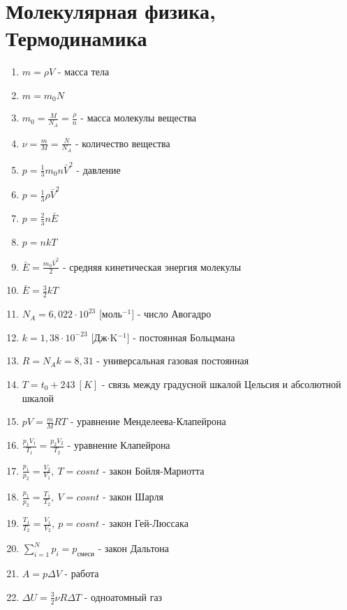 \documentclass{proc}
\begin{document}
\section{Молекулярная физика, Термодинамика}
\begin{enumerate}
    \item $\displaystyle m=\rho V$ -  масса тела
    \item $\displaystyle m=m_0N$
    \item $\displaystyle m_0=\frac{M}{N_A}=\frac{\rho}{n}$ -  масса молекулы вещества
    \item $\displaystyle \nu=\frac mM=\frac{N}{N_A}$ -  количество вещества
    \item $\displaystyle p=\frac 13 m_0 n \bar{V}^2$ -  давление
    \item $\displaystyle p=\frac 13 \rho \bar{V}^2$
    \item $\displaystyle p=\frac 23 n \bar E$
    \item $\displaystyle p=nkT$
    \item $\displaystyle \bar E = \frac{m_0\bar V^2}{2}$ -  средняя кинетическая энергия молекулы
    \item $\displaystyle \bar E = \frac 32 kT$
    \item $\displaystyle N_A=6,022\cdot10^{23}$ $[$моль$^{-1}]$ - число Авогадро
    \item $\displaystyle k=1,38\cdot10^{-23}$ $[$Дж$\cdot$K$^{-1}]$ - постоянная Больцмана
    \item $\displaystyle R=N_Ak = 8,31$ - универсальная газовая постоянная
    \item $\displaystyle T=t_0+243\ [K]$ - связь между градусной шкалой Цельсия и абсолютной шкалой
    \item $\displaystyle pV=\frac{m}{M}RT$ - уравнение Менделеева-Клапейрона
    \item $\displaystyle \frac{p_1V_1}{T_1}=\frac{p_2V_2}{T_2}$ - уравнение Клапейрона
    \item $\displaystyle \frac{p_1}{p_2}=\frac{V_2}{V_1},\ T=cosnt$ - закон Бойля-Мариотта
    \item $\displaystyle \frac{p_1}{p_2}=\frac{T_1}{T_2},\ V=cosnt$ - закон Шарля
    \item $\displaystyle \frac{T_1}{T_2}=\frac{V_1}{V_2},\ p=cosnt$ - закон Гей-Люссака
    \item $\displaystyle \sum_{i=1}^N p_i = p_{смеси}$ - закон Дальтона
    \item $\displaystyle A = p\Delta V$ - работа
    \item $\displaystyle \Delta U = \frac 32 \nu R \Delta T$ - одноатомный газ

\end{enumerate}
\end{document}
